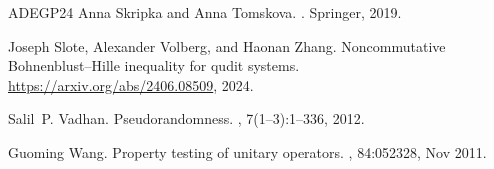\documentclass[10pt,a4paper]{article}
\theoremstyle{plain}
\theoremstyle{definition}
\newcommand{\1}{\mathbb{1}} %
\begin{document}
\begin{thebibliography}{ADEGP24}
Anna Skripka and Anna Tomskova.
.
\newblock Springer, 2019.

Joseph Slote, Alexander Volberg, and Haonan Zhang.
\newblock Noncommutative {B}ohnenblust--{H}ille inequality for qudit systems.
\newblock \url{https://arxiv.org/abs/2406.08509}, 2024.

Salil~P. Vadhan.
\newblock Pseudorandomness.
, 7(1–3):1--336, 2012.

Guoming Wang.
\newblock Property testing of unitary operators.
, 84:052328, Nov 2011.

\end{thebibliography}
\end{document}
